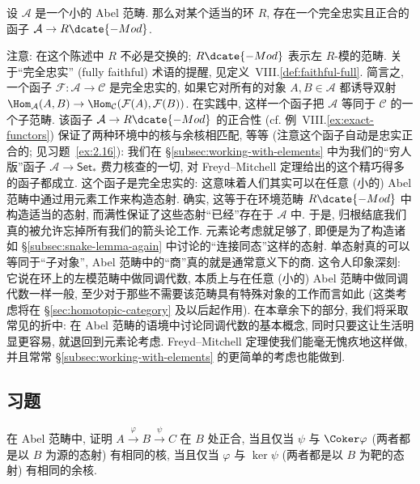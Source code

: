 \begin{theorem}\label{thm:freyd-mitchell}
设 $\mathcal{A}$ 是一个小的 Abel 范畴. 那么对某个适当的环 $R$, 存在一个完全忠实且正合的函子 $\mathcal{A}\to R\dcate{-Mod}$.
\end{theorem}

\indent 注意: 在这个陈述中 $R$ 不必是交换的; $R\dcate{-Mod}$ 表示左 $R$-模的范畴.
关于``完全忠实'' (fully faithful) 术语的提醒, 见定义~VIII.\ref{def:faithful-full}. 简言之, 一个函子 $\mathcal{F}:\mathcal{A}\to\mathcal{C}$ 是完全忠实的, 如果它对所有的对象 $A,B\in\mathcal{A}$ 都诱导双射 $\Hom_{\mathcal{A}}(A,B)\to\Hom_{\mathcal{C}}(\mathcal{F}(A),\mathcal{F}(B))$. 在实践中, 这样一个函子把 $\mathcal{A}$ 等同于 $\mathcal{C}$ 的一个子范畴. 该函子 $\mathcal{A}\to R\dcate{-Mod}$ 的正合性 (cf. 例~VIII.\ref{ex:exact-functors}) 保证了两种环境中的核与余核相匹配, 等等 (注意这个函子自动是忠实正合的; 见习题~\ref{ex:2.16}): 我们在 \S\ref{subsec:working-with-elements} 中为我们的``穷人版''函子 $\mathcal{A}\to\mathsf{Set}_*$ 费力核查的一切, 对 Freyd–Mitchell 定理给出的这个精巧得多的函子都成立.
这个函子是完全忠实的: 这意味着人们其实可以在任意 (小的) Abel 范畴中通过用元素工作来构造态射. 确实, 这等于在环境范畴 $R\dcate{-Mod}$ 中构造适当的态射, 而满性保证了这些态射``已经''存在于 $\mathcal{A}$ 中.
于是, 归根结底我们真的被允许忘掉所有我们的箭头论工作. 元素论考虑就足够了, 即便是为了构造诸如 \S\ref{subsec:snake-lemma-again} 中讨论的``连接同态''这样的态射. 单态射真的可以等同于``子对象'', Abel 范畴中的``商''真的就是通常意义下的商.
这令人印象深刻: 它说在环上的左模范畴中做同调代数, 本质上与在任意 (小的) Abel 范畴中做同调代数一样一般, 至少对于那些不需要该范畴具有特殊对象的工作而言如此 (这类考虑将在 \S\ref{sec:homotopic-category} 及以后起作用). 在本章余下的部分, 我们将采取常见的折中: 在 Abel 范畴的语境中讨论同调代数的基本概念, 同时只要这让生活明显更容易, 就退回到元素论考虑. Freyd–Mitchell 定理使我们能毫无愧疚地这样做, 并且常常 \S\ref{subsec:working-with-elements} 的更简单的考虑也能做到.

\subsection*{习题}
{}

\begin{prob}\label{ex:2.1}
在 Abel 范畴中, 证明 $A\xrightarrow{\varphi} B\xrightarrow{\psi} C$ 在 $B$ 处正合, 当且仅当 $\psi$ 与 $\Coker\varphi$ (两者都是以 $B$ 为源的态射) 有相同的核, 当且仅当 $\varphi$ 与 $\ker\psi$ (两者都是以 $B$ 为靶的态射) 有相同的余核.
\end{prob}

